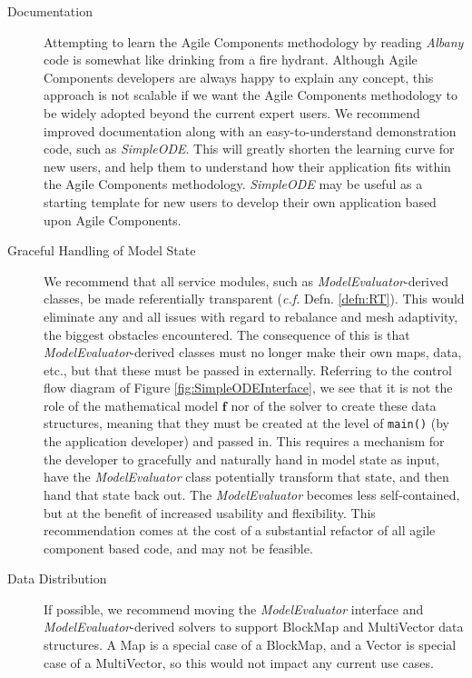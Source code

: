 \documentclass[pdf,ps2pdf,12pt,report]{SANDreport}
\theoremstyle{plain}
\theoremstyle{definition}
\theoremstyle{remark}
\numberwithin{equation}{section}
\begin{document}
\begin{description}
  \item[Documentation] Attempting to learn the Agile Components methodology by reading \emph{Albany} code is somewhat like drinking from a fire hydrant. Although Agile Components developers are always happy to explain any concept, this approach is not scalable if we want the Agile Components methodology to be widely adopted beyond the current expert users. We recommend improved documentation along with an easy-to-understand demonstration code, such as \emph{SimpleODE}. This will greatly shorten the learning curve for new users, and help them to understand how their application fits within the Agile Components methodology. \emph{SimpleODE} may be useful as a starting template for new users to develop their own application based upon Agile Components.
  \item[Graceful Handling of Model State] We recommend that all service modules, such as \emph{ModelEvaluator}-derived classes, be made referentially transparent (\emph{c.f.} Defn. \ref{defn:RT}). This would eliminate any and all issues with regard to rebalance and mesh adaptivity, the biggest obstacles encountered. The consequence of this is that \emph{ModelEvaluator}-derived classes must no longer make their own maps, data, etc., but that these must be passed in externally. Referring to the control flow diagram of Figure \ref{fig:SimpleODEInterface}, we see that it is not the role of the mathematical model $\mathbf{f}$ nor of the solver to create these data structures, meaning that they must be created at the level of \verb"main()" (by the application developer) and passed in. This requires a mechanism for the developer to gracefully and naturally hand in model state as input, have the \emph{ModelEvaluator} class potentially transform that state, and then hand that state back out. The \emph{ModelEvaluator} becomes less self-contained, but at the benefit of increased usability and flexibility. This recommendation comes at the cost of a substantial refactor of all agile component based code, and may not be feasible.
  \item[Data Distribution] If possible, we recommend moving the \emph{ModelEvaluator} interface and \emph{ModelEvaluator}-derived solvers to support BlockMap and MultiVector data structures. A Map is a special case of a BlockMap, and a Vector is special case of a MultiVector, so this would not impact any current use cases.

\end{description}
\end{document}
